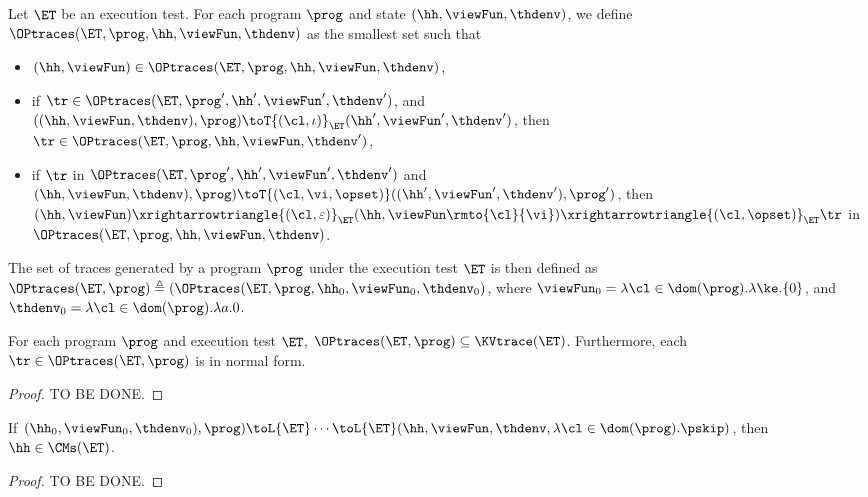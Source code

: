 \begin{definition}
Let $\ET$ be an execution test. For each program $\prog$ and state 
$(\hh, \viewFun, \thdenv)$, we define $\OPtraces(\ET, \prog, \hh, \viewFun, \thdenv)$ 
as the smallest set such that 
\begin{itemize}
\item $(\hh, \viewFun) \in \OPtraces(\ET, \prog, \hh, \viewFun, \thdenv)$, 
\item if $\tr \in \OPtraces(\ET, \prog', \hh', \viewFun',\thdenv')$, 
and $((\hh, \viewFun, \thdenv) , \prog) \toT{(\cl, \iota)}_{\ET} (\hh', \viewFun', \thdenv')$, 
then $\tr \in \OPtraces(\ET, \prog, \hh, \viewFun, \thdenv')$, 
\item if $\tr$ in $\OPtraces(\ET, \prog', \hh', \viewFun', \thdenv')$ and 
\newline $(\hh, \viewFun, \thdenv), \prog) \toT{(\cl, \vi, \opset)} ((\hh', \viewFun', \thdenv'), \prog')$,  
then $(\hh, \viewFun) \xrightarrowtriangle{(\cl, \varepsilon)}_{\ET} (\hh, \viewFun\rmto{\cl}{\vi}) 
\xrightarrowtriangle{(\cl, \opset)}_{\ET} \tr$ in $\OPtraces(\ET, \prog, \hh, \viewFun, \thdenv)$. 
\end{itemize}

The set of traces generated by a program $\prog$ under the execution test $\ET$ is 
then defined as $\OPtraces(\ET, \prog) \triangleq (\OPtraces(\ET, \prog, \hh_{0}, \viewFun_{0}, 
\thdenv_{0})$, where $\viewFun_{0} = \lambda \cl \in \dom(\prog).\lambda \ke.\{0\}$, and 
$\thdenv_{0} = \lambda \cl \in \dom(\prog).\lambda a.0$.

\end{definition}

\begin{proposition}
For each program $\prog$ and execution test $\ET$, 
$\OPtraces(\ET, \prog) \subseteq \KVtrace(\ET)$. 
Furthermore, each $\tr \in \OPtraces(\ET, \prog)$ is in normal form. 
\end{proposition}
\begin{proof}
    TO BE DONE.
\end{proof}

\begin{corollary}
If $(\hh_{0}, \viewFun_{0}, \thdenv_{0}), \prog) \toL{\ET} \cdots \toL{\ET} 
(\hh, \viewFun, \thdenv, \lambda \cl \in \dom(\prog). \pskip)$, then $\hh \in \CMs(\ET)$.
\end{corollary}
\begin{proof}
    TO BE DONE.
\end{proof}

